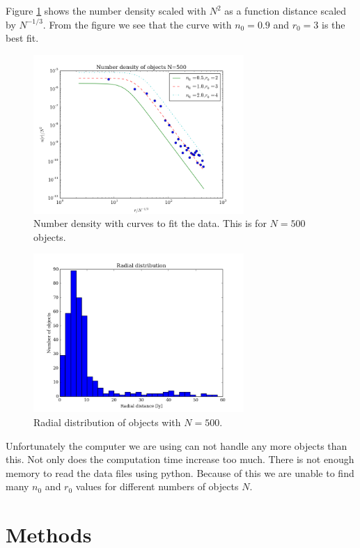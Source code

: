 \documentclass{aa}   %
\begin{document}
Figure \ref{number_density_500_scaled_n} shows the number density scaled with $N^2$ as a function distance scaled by $N^{-1/3}$. From the figure we see that the curve with $n_0 = 0.9$ and $r_0 = 3$ is the best fit.
\begin{figure}[hbtp]
 \centering
 \includegraphics[width=80mm]{number_density_500_scaled_n.png}
 \caption[]{\label{number_density_500_scaled_n}
   Number density with curves to fit the data. This is for $N=500$ objects.
 }
\end{figure}
\begin{figure}[hbtp]
 \centering
 \includegraphics[width=80mm]{number_density_500.png}
 \caption[]{\label{number_density_500}
   Radial distribution of objects with $N=500$.
 }
\end{figure}

Unfortunately the computer we are using can not handle any more objects than this. Not only does the computation time increase too much. There is not enough memory to read the data files using python.
Because of this we are unable to find many $n_0$ and $r_0$ values for different numbers of objects $N$.

\section{Methods}    \label{sec:methods}
\end{document}
